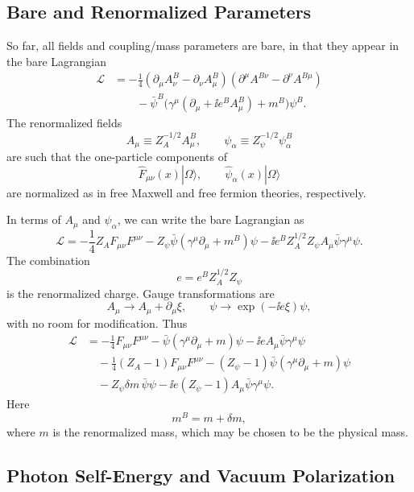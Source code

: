 \subsection{Bare and Renormalized Parameters}

So far, all fields and coupling/mass parameters are bare, in that they
appear in the bare Lagrangian
\[
\begin{aligned}
  \mathcal L
  &=
  -\frac14
  (\partial_\mu A_\nu^B-\partial_\nu A_\mu^B)
  (\partial^\mu A^{B\nu}-\partial^\nu A^{B\mu})
\\
  &\qquad
  -\bar\psi^B\bigl(
    \gamma^\mu(\partial_\mu+\ii e^B A_\mu^B)+m^B
  \bigr)\psi^B .
\end{aligned}
\]
The renormalized fields
\[
  A_\mu\equiv Z_A^{-1/2}A_\mu^B,
  \qquad
  \psi_\alpha\equiv Z_\psi^{-1/2}\psi_\alpha^B
\]
are such that the one-particle components of
\[
  \widehat F_{\mu\nu}(x)|\Omega\rangle,
  \qquad
  \widehat\psi_\alpha(x)|\Omega\rangle
\]
are normalized as in free Maxwell and free fermion theories, respectively.

In terms of \(A_\mu\) and \(\psi_\alpha\), we can write the bare
Lagrangian as
\[
  \mathcal L
  =
  -\frac14 Z_A F_{\mu\nu}F^{\mu\nu}
  -Z_\psi\bar\psi(\gamma^\mu\partial_\mu+m^B)\psi
  -\ii e^B Z_A^{1/2}Z_\psi A_\mu\bar\psi\gamma^\mu\psi.
\]
The combination
\[
  e=e^B Z_A^{1/2}Z_\psi
\]
is the renormalized charge.  Gauge transformations are
\[
  A_\mu\to A_\mu+\partial_\mu\xi,
  \qquad
  \psi\to\exp(-\ii e\xi)\psi,
\]
with no room for modification.  Thus
\[
\begin{aligned}
  \mathcal L
  &=
  -\frac14F_{\mu\nu}F^{\mu\nu}
  -\bar\psi(\gamma^\mu\partial_\mu+m)\psi
  -\ii e A_\mu\bar\psi\gamma^\mu\psi
\\
  &\quad
  -\frac14(Z_A-1)F_{\mu\nu}F^{\mu\nu}
  -(Z_\psi-1)\bar\psi(\gamma^\mu\partial_\mu+m)\psi
\\
  &\quad
  -Z_\psi\delta m\,\bar\psi\psi
  -\ii e(Z_\psi-1)A_\mu\bar\psi\gamma^\mu\psi .
\end{aligned}
\]
Here
\[
  m^B=m+\delta m,
\]
where \(m\) is the renormalized mass, which may be chosen to be the
physical mass.

\subsection{Photon Self-Energy and Vacuum Polarization}

